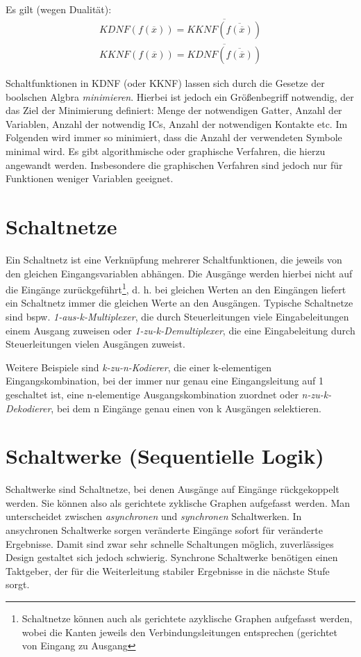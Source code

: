 \documentclass[11pt]{article}
\begin{document}
Es gilt (wegen Dualität):
\begin{align}
  KDNF(f(\overline{x})) = \overline{KKNF(\overline{f(\overline{x})})} \\
  KKNF(f(\overline{x})) = \overline{KDNF(\overline{f(\overline{x})})}
\end{align}

Schaltfunktionen in KDNF (oder KKNF) lassen sich durch die Gesetze der boolschen Algbra \textit{minimieren}. Hierbei ist jedoch ein Größenbegriff notwendig, der das Ziel der Minimierung definiert: Menge der notwendigen Gatter, Anzahl der Variablen, Anzahl der notwendig ICs, Anzahl der notwendigen Kontakte etc. Im Folgenden wird immer so minimiert, dass die Anzahl der verwendeten Symbole minimal wird. Es gibt algorithmische oder graphische Verfahren, die hierzu angewandt werden. Insbesondere die graphischen Verfahren sind jedoch nur für Funktionen weniger Variablen geeignet.

\section{Schaltnetze}
Ein Schaltnetz ist eine Verknüpfung mehrerer Schaltfunktionen, die jeweils von den gleichen Eingangsvariablen abhängen. Die Ausgänge werden hierbei nicht auf die Eingänge zurückgeführt\footnote{Schaltnetze können auch als gerichtete azyklische Graphen aufgefasst werden, wobei die Kanten jeweils den Verbindungsleitungen entsprechen (gerichtet von Eingang zu Ausgang}, d. h. bei gleichen Werten an den Eingängen liefert ein Schaltnetz immer die gleichen Werte an den Ausgängen.
Typische Schaltnetze sind bspw. \textit{1-aus-k-Multiplexer}, die durch Steuerleitungen viele Eingabeleitungen einem Ausgang zuweisen oder \textit{1-zu-k-Demultiplexer}, die eine Eingabeleitung durch Steuerleitungen vielen Ausgängen zuweist.

Weitere Beispiele sind \textit{k-zu-n-Kodierer}, die einer k-elementigen Eingangskombination, bei der immer nur genau eine Eingangsleitung auf 1 geschaltet ist, eine n-elementige Ausgangskombination zuordnet oder \textit{n-zu-k-Dekodierer}, bei dem n Eingänge genau einen von k Ausgängen selektieren.

\section{Schaltwerke \textnormal{(Sequentielle Logik)}}
Schaltwerke sind Schaltnetze, bei denen Ausgänge auf Eingänge rückgekoppelt werden. Sie können also als gerichtete zyklische Graphen aufgefasst werden. Man unterscheidet zwischen \textit{asynchronen} und \textit{synchronen} Schaltwerken. In ansychronen Schaltwerke sorgen veränderte Eingänge sofort für veränderte Ergebnisse. Damit sind zwar sehr schnelle Schaltungen möglich, zuverlässiges Design gestaltet sich jedoch schwierig. Synchrone Schaltwerke benötigen einen Taktgeber, der für die Weiterleitung stabiler Ergebnisse in die nächste Stufe sorgt.
\end{document}
